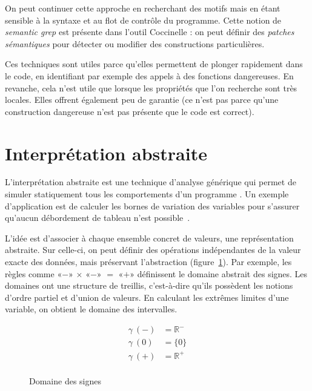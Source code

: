 On peut continuer cette approche en recherchant des motifs mais en étant
sensible à la syntaxe et au flot de contrôle du programme. Cette notion de
\emph{semantic grep} est présente dans l'outil Coccinelle
\cite{coccinelle09,coccinelle11}: on peut définir des
\emph{patches sémantiques} pour détecter ou modifier des constructions
particulières.

Ces techniques sont utiles parce qu'elles permettent de plonger rapidement dans
le code, en identifiant par exemple des appels à des fonctions dangereuses. En
revanche, cela n'est utile que lorsque les propriétés que l'on recherche sont
très locales. Elles offrent également peu de garantie (ce n'est pas parce qu'une
construction dangereuse n'est pas présente que le code est correct).


\section{Interprétation abstraite}
\label{sec:absint}

L'interprétation abstraite est une technique d'analyse générique qui permet de
simuler statiquement tous les comportements d'un programme
\cite{Cousot77,Cousot92-1}. Un exemple d'application est de calculer les bornes
de variation des variables pour s'assurer qu'aucun débordement de tableau n'est
possible~\cite{AllamigeonHymansSSTIC07}.

L'idée est d'associer à chaque ensemble concret de valeurs, une représentation
abstraite. Sur celle-ci, on peut définir des opérations indépendantes de la
valeur exacte des données, mais préservant l'abstraction
(figure~\ref{fig:dom-sig}). Par exemple, les règles comme
«$-$» $×$ «$-$» $=$ «$+$»
définissent le domaine abstrait des signes. Les domaines ont une structure de
treillis, c'est-à-dire qu'ils possèdent les notions d'ordre partiel et d'union
de valeurs. En calculant les extrêmes limites d'une variable, on obtient le
domaine des intervalles.

\begin{figure}[h]%
\centering

\begin{minipage}{0.4\textwidth}
\end{minipage}
\begin{minipage}{0.4\textwidth}
  \begin{align*}
  γ~(-) &= ℝ^- \\
  γ~(0) &= \{0\} \\
  γ~(+) &= ℝ^+ \\
  \end{align*}
\end{minipage}

\caption{Domaine des signes}
\label{fig:dom-sig}
\end{figure}%

